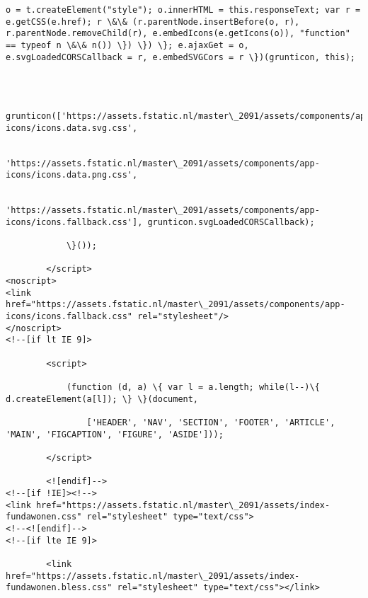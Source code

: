 \documentclass[11pt]{article}
\begin{document}
\begin{Verbatim}[commandchars=\\\{\}]
o = t.createElement("style"); o.innerHTML = this.responseText; var r = e.getCSS(e.href); r \&\& (r.parentNode.insertBefore(o, r), r.parentNode.removeChild(r), e.embedIcons(e.getIcons(o)), "function" == typeof n \&\& n()) \}) \}) \}; e.ajaxGet = o, e.svgLoadedCORSCallback = r, e.embedSVGCors = r \})(grunticon, this);



                grunticon(['https://assets.fstatic.nl/master\_2091/assets/components/app-icons/icons.data.svg.css',

                           'https://assets.fstatic.nl/master\_2091/assets/components/app-icons/icons.data.png.css',

                           'https://assets.fstatic.nl/master\_2091/assets/components/app-icons/icons.fallback.css'], grunticon.svgLoadedCORSCallback);

            \}());

        </script>
<noscript>
<link href="https://assets.fstatic.nl/master\_2091/assets/components/app-icons/icons.fallback.css" rel="stylesheet"/>
</noscript>
<!--[if lt IE 9]>

        <script>

            (function (d, a) \{ var l = a.length; while(l--)\{ d.createElement(a[l]); \} \}(document,

                ['HEADER', 'NAV', 'SECTION', 'FOOTER', 'ARTICLE', 'MAIN', 'FIGCAPTION', 'FIGURE', 'ASIDE']));

        </script>

        <![endif]-->
<!--[if !IE]><!-->
<link href="https://assets.fstatic.nl/master\_2091/assets/index-fundawonen.css" rel="stylesheet" type="text/css">
<!--<![endif]-->
<!--[if lte IE 9]>

        <link href="https://assets.fstatic.nl/master\_2091/assets/index-fundawonen.bless.css" rel="stylesheet" type="text/css"></link>


\end{Verbatim}
\end{document}
